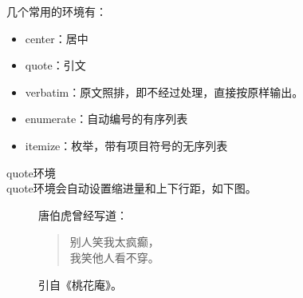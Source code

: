 几个常用的环境有：
\begin{itemize}
\item center：居中
\item quote：引文
\item verbatim：原文照排，即不经过处理，直接按原样输出。
\item enumerate：自动编号的有序列表
\item itemize：枚举，带有项目符号的无序列表
\end{itemize}

\begin{example}{quote环境}\\
quote环境会自动设置缩进量和上下行距，如下图。
\begin{figure}[h]
\centering
{}
\hspace{0.1\textwidth}
\begin{minipage}[h]{0.4\textwidth}
\centering
\begin{code}
唐伯虎曾经写道：
\begin{quote}
别人笑我太疯癫，\\我笑他人看不穿。
\end{quote}
引自《桃花庵》。
\end{code}
\end{minipage}
\end{figure}
\end{example}

